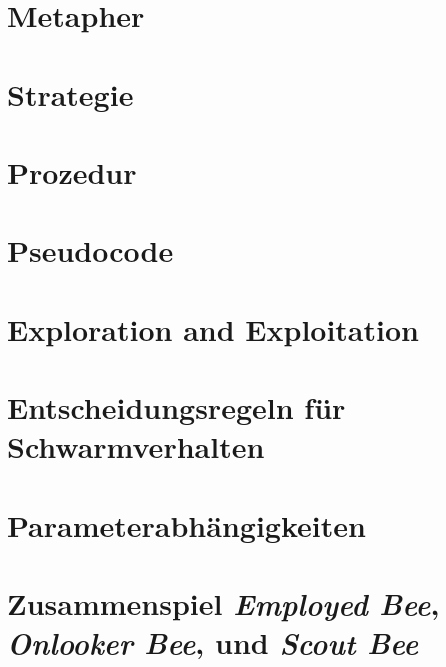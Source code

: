 

\section{Metapher}

\section{Strategie}

\section{Prozedur}

\section{Pseudocode}

\section{Exploration and Exploitation}

\section{Entscheidungsregeln für Schwarmverhalten}

\section{Parameterabhängigkeiten}

\section{Zusammenspiel \emph{Employed Bee}, \emph{Onlooker Bee}, und
    \emph{Scout Bee}}